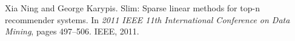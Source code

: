 
\begin{DoxyDescription}
\item[\label{citelist_CITEREF_ning2011slim}%
\Hypertarget{citelist_CITEREF_ning2011slim}%
\mbox{[}1\mbox{]}]Xia Ning and George Karypis. Slim\+: Sparse linear methods for top-\/n recommender systems. In {\itshape 2011 I\+E\+EE 11th International Conference on Data Mining}, pages 497--506. I\+E\+EE, 2011.


\end{DoxyDescription}